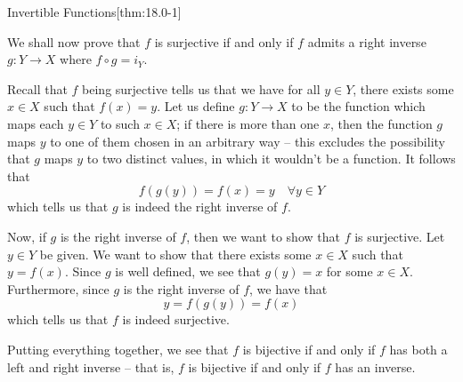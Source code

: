 \begin{thmBox}{Invertible Functions}[thm:18.0-1]
\begin{proofBox}
        We shall now prove that \( f \) is surjective if and 
        only if \( f \) admits a right inverse \( g: Y \rightarrow X \) where
        \( f \circ g = i_{ Y } \). 

        \baseSkip

        Recall that \( f \) being surjective tells us that we have for all 
        \( y \in Y \), there exists some \( x \in X \) such that
        \( f ( x ) = y \).
        Let us define \( g: Y \rightarrow X \) to be the function which maps
        each \( y \in Y \) to such \( x \in X \); if there is more than one
        \( x \), then the function \( g \) maps \( y \) to one of them
        chosen in an arbitrary way -- this excludes the possibility that 
        \( g \) maps \( y \) to two distinct values, in which it wouldn't be
        a function.
        It follows that
        \begin{equation*}
            f ( g ( y ) ) = f ( x ) = y
            \quad 
            \forall y \in Y   
        \end{equation*}
        which tells us that \( g \) is indeed the right inverse of \( f \).

        \baseSkip

        Now, if \( g \) is the right inverse of \( f \), then we want to show
        that \( f \) is surjective.
        Let \( y \in Y \) be given.
        We want to show that there exists some \( x \in X \) such that 
        \( y = f ( x ) \).
        Since \( g \) is well defined, we see that \( g ( y ) = x \) for some
        \( x \in X \).
        Furthermore, since \( g \) is the right inverse of \( f \), we have that
        \begin{equation*}
            y = f ( g ( y ) ) = f ( x )
        \end{equation*}
        which tells us that \( f \) is indeed surjective.

        \baseSkip

        Putting everything together, we see that \( f \) is bijective if and 
        only if \( f \) has both a left and right inverse -- that is, \( f \)
        is bijective if and only if \( f \) has an inverse.
    \end{proofBox}
\end{thmBox}

